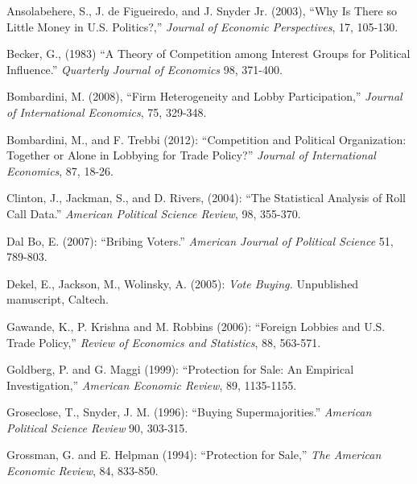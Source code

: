 \documentclass[12pt]{article}
\begin{document}
\begin{list}{}{\setlength{\leftmargin}{0.3in}\setlength{\rightmargin}{0.0in}\setlength{\itemindent}{-0.3in}\setlength{\itemsep}{0.0in}}


\item Ansolabehere, S., J. de Figueiredo, and J. Snyder Jr. (2003), ``Why Is There so Little Money in U.S. Politics?,'' {\em Journal of Economic Perspectives}, 17, 105-130.

\item Becker, G., (1983) ``A Theory of Competition among Interest Groups for Political Influence.'' {\em Quarterly Journal of Economics} 98, 371-400.

\item Bombardini, M. (2008), ``Firm Heterogeneity and Lobby Participation,'' {\em Journal of International Economics}, 75, 329-348.

\item Bombardini, M., and F. Trebbi (2012): ``Competition and Political Organization: Together or Alone in Lobbying for Trade Policy?'' {\em Journal of International Economics}, 87, 18-26.

\item Clinton, J., Jackman, S., and D. Rivers, (2004): ``The Statistical Analysis of Roll Call Data.'' {\em American Political Science Review}, 98, 355-370.

\item Dal Bo, E. (2007): ``Bribing Voters.'' {\em American Journal of Political Science} 51, 789-803.

\item Dekel, E., Jackson, M., Wolinsky, A. (2005): {\em Vote Buying.} Unpublished manuscript, Caltech.

\item Gawande, K., P. Krishna and M. Robbins (2006): ``Foreign Lobbies and U.S. Trade Policy,'' {\em Review of Economics and Statistics}, 88, 563-571.

\item Goldberg, P. and G. Maggi (1999): ``Protection for Sale: An Empirical Investigation,'' {\em American Economic Review}, 89, 1135-1155.

\item Groseclose, T., Snyder, J. M. (1996): ``Buying Supermajorities.'' {\em American Political Science Review} 90, 303-315.

\item Grossman, G. and E. Helpman (1994): ``Protection for Sale,'' {\em The American Economic Review}, 84, 833-850.


\end{list}
\end{document}
